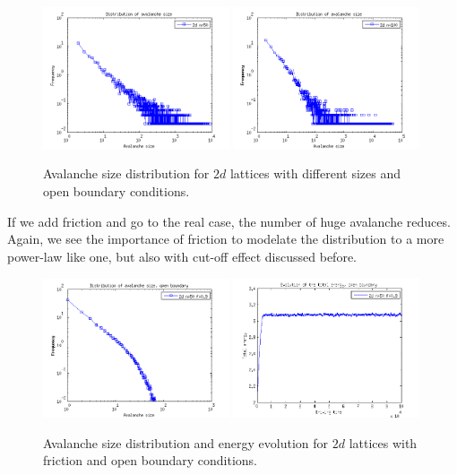 \begin{figure} 
\begin{center}
\includegraphics[width=0.49\textwidth]{results/2sn50.png}
\includegraphics[width=0.49\textwidth]{results/2sn100.png} 
\caption{Avalanche size distribution for $2d$ lattices with different sizes and open boundary conditions.}
\label{sn}
\end{center}
\end{figure} 

If we add friction and go to the real case, the number of huge avalanche reduces. 
Again, we see the importance of friction to modelate the distribution to a more power-law like one, but also with cut-off effect discussed before. 
\begin{figure} 
\begin{center}
\includegraphics[width=0.49\textwidth]{results/2sof.png}
\includegraphics[width=0.49\textwidth]{results/2eof.png}
\caption{Avalanche size distribution and energy evolution for $2d$ lattices with friction and open boundary conditions.}
\label{so}
\end{center}
\end{figure} 


